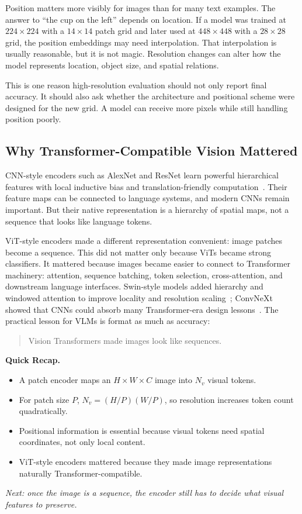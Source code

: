 Position matters more visibly for images than for many text examples. The answer to ``the cup on the left'' depends on location. If a model was trained at $224 \times 224$ with a $14 \times 14$ patch grid and later used at $448 \times 448$ with a $28 \times 28$ grid, the position embeddings may need interpolation. That interpolation is usually reasonable, but it is not magic. Resolution changes can alter how the model represents location, object size, and spatial relations.

This is one reason high-resolution evaluation should not only report final accuracy. It should also ask whether the architecture and positional scheme were designed for the new grid. A model can receive more pixels while still handling position poorly.

\subsection{Why Transformer-Compatible Vision Mattered}

CNN-style encoders such as AlexNet and ResNet learn powerful hierarchical features with local inductive bias and translation-friendly computation~\cite{krizhevsky2012imagenet,he2016deep}. Their feature maps can be connected to language systems, and modern CNNs remain important. But their native representation is a hierarchy of spatial maps, not a sequence that looks like language tokens.

ViT-style encoders made a different representation convenient: image patches become a sequence. This did not matter only because ViTs became strong classifiers. It mattered because images became easier to connect to Transformer machinery: attention, sequence batching, token selection, cross-attention, and downstream language interfaces. Swin-style models added hierarchy and windowed attention to improve locality and resolution scaling~\cite{liu2021swin}; ConvNeXt showed that CNNs could absorb many Transformer-era design lessons~\cite{liu2022convnet}. The practical lesson for VLMs is format as much as accuracy:

\begin{quote}
Vision Transformers made images look like sequences.
\end{quote}

\begin{quickrecap}
\textbf{Quick Recap.}
\begin{itemize}[nosep,leftmargin=1.5em]
  \item A patch encoder maps an $H \times W \times C$ image into $N_v$ visual tokens.
  \item For patch size $P$, $N_v = (H/P)(W/P)$, so resolution increases token count quadratically.
  \item Positional information is essential because visual tokens need spatial coordinates, not only local content.
  \item ViT-style encoders mattered because they made image representations naturally Transformer-compatible.
\end{itemize}
\textit{Next: once the image is a sequence, the encoder still has to decide what visual features to preserve.}
\end{quickrecap}


